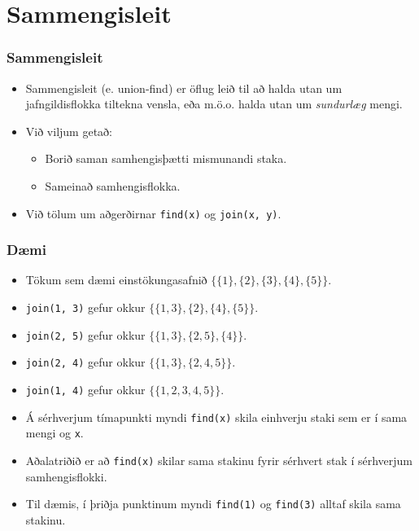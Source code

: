 \documentclass[handout]{beamer}
\begin{document}
\section[Sammengisleit]{Sammengisleit}

\begin{frame}
\frametitle{Sammengisleit}
\begin{itemize}

\item<1-> Sammengisleit (e. union-find) er öflug leið til að halda utan um jafngildisflokka tiltekna vensla,
	eða m.ö.o. halda utan um \emph{sundurlæg} mengi.
\item<2-> Við viljum getað:
	\begin{itemize}
		\item<3-> Borið saman samhengisþætti mismunandi staka.
		\item<4-> Sameinað samhengisflokka.
	\end{itemize}
\item<5-> Við tölum um aðgerðirnar \texttt{find(x)} og \texttt{join(x, y)}.

\end{itemize}
\end{frame}

\begin{frame}
\frametitle{Dæmi}
\begin{itemize}

	\item<1-> Tökum sem dæmi einstökungasafnið
		$\{\{1\}, \{2\}, \{3\}, \{4\}, \{5\}\}$. 
	\item<2-> \texttt{join(1, 3)} gefur okkur
		$\{\{1, 3\}, \{2\}, \{4\}, \{5\}\}$. 
	\item<3-> \texttt{join(2, 5)} gefur okkur
		$\{\{1, 3\}, \{2, 5\}, \{4\}\}$. 
	\item<4-> \texttt{join(2, 4)} gefur okkur
		$\{\{1, 3\}, \{2, 4, 5\}\}$. 
	\item<5-> \texttt{join(1, 4)} gefur okkur
		$\{\{1, 2, 3, 4, 5\}\}$. 
	\item<6-> Á sérhverjum tímapunkti myndi \texttt{find(x)} skila einhverju staki sem er í sama mengi og \texttt{x}.
	\item<7-> Aðalatriðið er að \texttt{find(x)} skilar sama stakinu fyrir sérhvert stak í sérhverjum samhengisflokki.
	\item<8-> Til dæmis, í þriðja punktinum myndi \texttt{find(1)} og \texttt{find(3)} alltaf skila sama stakinu.
\end{itemize}
\end{frame}
\end{document}
